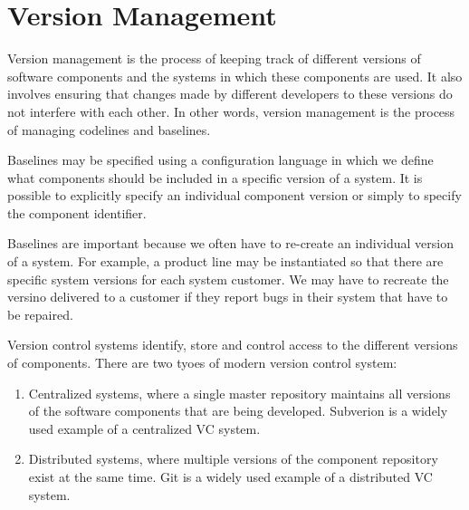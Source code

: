 \section{Version Management}
Version management is the process of keeping track of different versions of software components and the systems in which these components are used. It also involves ensuring that changes made by different developers to these versions do not interfere with each other. In other words, version management is the process of managing codelines and baselines.

Baselines may be specified using a configuration language in which we define what components should be included in a specific version of a system. It is possible to explicitly specify an individual component version or simply to specify the component identifier.

Baselines are important because we often have to re-create an individual version of a system. For example, a product line may be instantiated so that there are specific system versions for each system customer. We may have to recreate the versino delivered to a customer if they report bugs in their system that have to be repaired.

Version control systems identify, store and control access to the different versions of components. There are two tyoes of modern version control system:
\begin{enumerate}
    \item Centralized systems, where a single master repository maintains all versions of the software components that are being developed. Subverion is a widely used example of a centralized VC system.
    \item Distributed systems, where multiple versions of the component repository exist at the same time. Git is a widely used example of a distributed VC system.
\end{enumerate}


